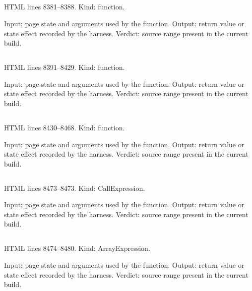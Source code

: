 \subsection*{\texttt{}}
\label{vf_456_makeRDESTables}
HTML lines 8381--8388. Kind: function.

Input: page state and arguments used by the function.
Output: return value or state effect recorded by the harness.
Verdict: source range present in the current build.

\subsection*{\texttt{}}
\label{vf_457_rScript}
HTML lines 8391--8429. Kind: function.

Input: page state and arguments used by the function.
Output: return value or state effect recorded by the harness.
Verdict: source range present in the current build.

\subsection*{\texttt{}}
\label{vf_458_pyScript}
HTML lines 8430--8468. Kind: function.

Input: page state and arguments used by the function.
Output: return value or state effect recorded by the harness.
Verdict: source range present in the current build.

\subsection*{\texttt{}}
\label{vf_459_BASE_MACHINE_METADATA}
HTML lines 8473--8473. Kind: CallExpression.

Input: page state and arguments used by the function.
Output: return value or state effect recorded by the harness.
Verdict: source range present in the current build.

\subsection*{\texttt{}}
\label{vf_460_JSONLD_STANDARDS}
HTML lines 8474--8480. Kind: ArrayExpression.

Input: page state and arguments used by the function.
Output: return value or state effect recorded by the harness.
Verdict: source range present in the current build.

